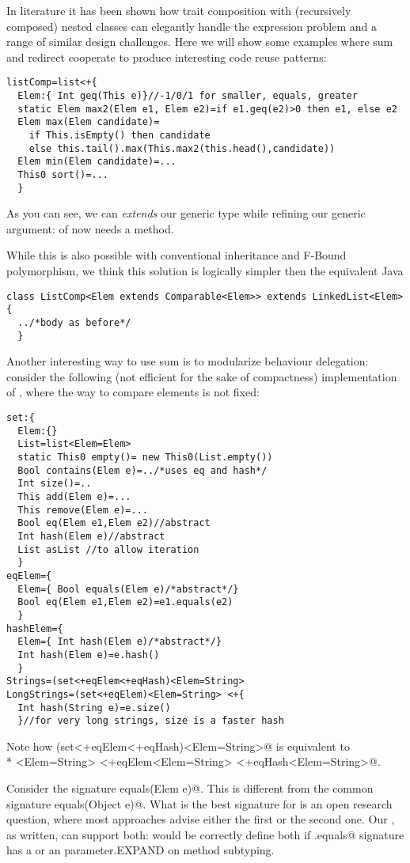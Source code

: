 In literature it has been shown how trait composition with (recursively composed) nested classes can 
elegantly handle the expression problem and a range of similar design challenges.
Here we will show some examples where sum and redirect cooperate to produce interesting code reuse patterns:

\begin{lstlisting}
listComp=list<+{
  Elem:{ Int geq(This e)}//-1/0/1 for smaller, equals, greater
  static Elem max2(Elem e1, Elem e2)=if e1.geq(e2)>0 then e1, else e2
  Elem max(Elem candidate)=
    if This.isEmpty() then candidate
    else this.tail().max(This.max2(this.head(),candidate))
  Elem min(Elem candidate)=...
  This0 sort()=...
  }
\end{lstlisting}
As you can see, we can \emph{extends} our generic type while refining our generic argument:
\Q@Elem@ of \Q@listComp@ now needs a \Q@geq@ method.

While this is also possible with conventional inheritance and F-Bound polymorphism, we think this solution is logically simpler then the equivalent Java
\begin{lstlisting}
class ListComp<Elem extends Comparable<Elem>> extends LinkedList<Elem>{
  ../*body as before*/
  }
\end{lstlisting}

Another interesting way to use sum is to modularize behaviour delegation: consider the following
(not efficient for the sake of compactness) implementation of \Q@set@, where the way to compare elements is not fixed:
\begin{lstlisting}
set:{
  Elem:{}
  List=list<Elem=Elem>
  static This0 empty()= new This0(List.empty())
  Bool contains(Elem e)=../*uses eq and hash*/
  Int size()=..
  This add(Elem e)=...
  This remove(Elem e)=...
  Bool eq(Elem e1,Elem e2)//abstract
  Int hash(Elem e)//abstract
  List asList //to allow iteration
  }
eqElem={
  Elem={ Bool equals(Elem e)/*abstract*/}
  Bool eq(Elem e1,Elem e2)=e1.equals(e2)
  }
hashElem={
  Elem={ Int hash(Elem e)/*abstract*/}
  Int hash(Elem e)=e.hash()
  }
Strings=(set<+eqElem<+eqHash)<Elem=String>
LongStrings=(set<+eqElem)<Elem=String> <+{
  Int hash(String e)=e.size()
  }//for very long strings, size is a faster hash
\end{lstlisting}
Note how 
\Q@(set<+eqElem<+eqHash)<Elem=String>@
is equivalent to\\*
 \Q@set<Elem=String> <+eqElem<Elem=String> <+eqHash<Elem=String>@.

Consider the signature \Q@Bool equals(Elem e)@.
This is different from the common signature \Q@Bool equals(Object e)@. What is the best
signature for \Q@equals@ is an open research question, where most approaches advise either the
first or the second one. Our \Q@eqElem@, as written, can support both:
\Q@Strings@ would be correctly define both if \Q@String.equals@ signature
has a \Q@String@ or an \Q@Object@ parameter.EXPAND on method subtyping.


